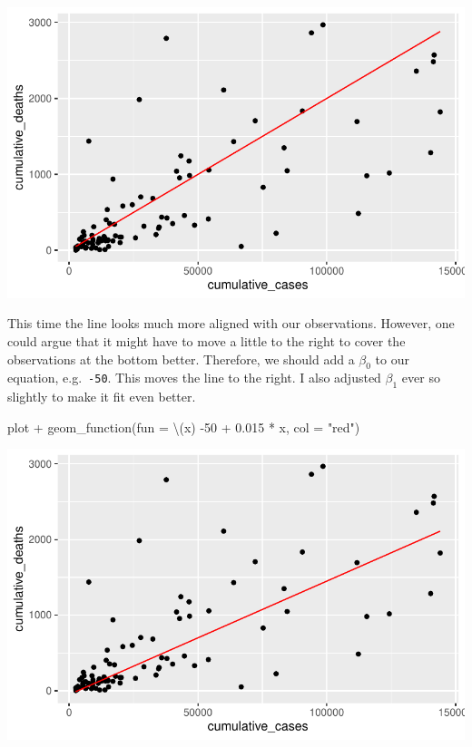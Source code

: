 \documentclass[
  letterpaper,
]{krantz}
\makeatletter
\newenvironment{Shaded}{\begin{snugshade}}{\end{snugshade}}
\newcommand{\AttributeTok}[1]{\textcolor[rgb]{0.40,0.45,0.13}{#1}}
\newcommand{\DecValTok}[1]{\textcolor[rgb]{0.68,0.00,0.00}{#1}}
\newcommand{\FloatTok}[1]{\textcolor[rgb]{0.68,0.00,0.00}{#1}}
\newcommand{\FunctionTok}[1]{\textcolor[rgb]{0.28,0.35,0.67}{#1}}
\newcommand{\NormalTok}[1]{\textcolor[rgb]{0.00,0.23,0.31}{#1}}
\newcommand{\SpecialCharTok}[1]{\textcolor[rgb]{0.37,0.37,0.37}{#1}}
\newcommand{\StringTok}[1]{\textcolor[rgb]{0.13,0.47,0.30}{#1}}
\newenvironment{kframe}{%
\medskip{}
\setlength{\fboxsep}{.8em}
 \def\at@end@of@kframe{}%
 \ifinner\ifhmode%
  \def\at@end@of@kframe{\end{minipage}}%
  \begin{minipage}{\columnwidth}%
 \fi\fi%
 \def\FrameCommand##1{\hskip\@totalleftmargin \hskip-\fboxsep
 \colorbox{shadecolor}{##1}\hskip-\fboxsep
     \hskip-\linewidth \hskip-\@totalleftmargin \hskip\columnwidth}%
 \MakeFramed {\advance\hsize-\width
   \@totalleftmargin\z@ \linewidth\hsize
   \@setminipage}}%
 {\par\unskip\endMakeFramed%
 \at@end@of@kframe}
\renewenvironment{Shaded}{\begin{kframe}}{\end{kframe}}
\makeatother
\begin{document}
\includegraphics{13_regressions_files/figure-latex/fitting-model-by-hand-step-five-1.pdf}

This time the line looks much more aligned with our observations.
However, one could argue that it might have to move a little to the
right to cover the observations at the bottom better. Therefore, we
should add a \(\beta_0\) to our equation, e.g.~\texttt{-50}. This moves
the line to the right. I also adjusted \(\beta_1\) ever so slightly to
make it fit even better.

\begin{Shaded}
\begin{Highlighting}[]
\NormalTok{plot }\SpecialCharTok{+}
  \FunctionTok{geom\_function}\NormalTok{(}\AttributeTok{fun =}\NormalTok{ \textbackslash{}(x) }\SpecialCharTok{{-}}\DecValTok{50} \SpecialCharTok{+} \FloatTok{0.015} \SpecialCharTok{*}\NormalTok{ x, }\AttributeTok{col =} \StringTok{"red"}\NormalTok{)}
\end{Highlighting}
\end{Shaded}

\includegraphics{13_regressions_files/figure-latex/fitting-model-by-hand-step-six-1.pdf}
\end{document}
